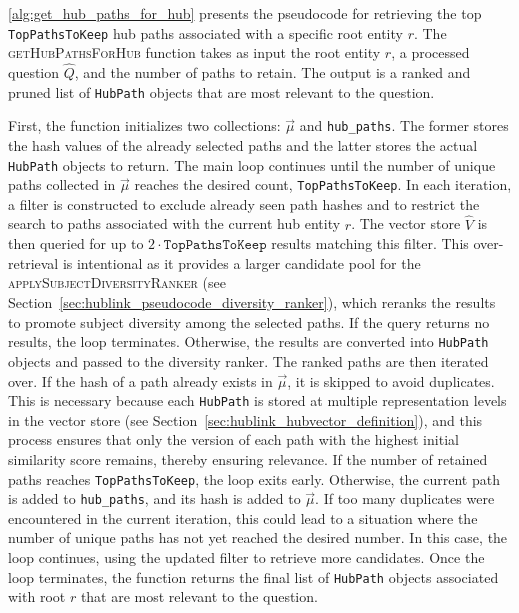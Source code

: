 \autoref{alg:get_hub_paths_for_hub} presents the pseudocode for retrieving the top \texttt{TopPathsToKeep} hub paths associated with a specific root entity \(r\). The \textsc{getHubPathsForHub} function takes as input the root entity \(r\), a processed question \(\hat{Q}\), and the number of paths to retain. The output is a ranked and pruned list of \texttt{HubPath} objects that are most relevant to the question.

First, the function initializes two collections: \(\vec{\mu}\) and \texttt{hub\_paths}. The former stores the hash values of the already selected paths and the latter stores the actual \texttt{HubPath} objects to return. The main loop continues until the number of unique paths collected in \(\vec{\mu}\) reaches the desired count, \texttt{TopPathsToKeep}. In each iteration, a filter is constructed to exclude already seen path hashes and to restrict the search to paths associated with the current hub entity \(r\). The vector store \(\hat{V}\) is then queried for up to \(2 \cdot \texttt{TopPathsToKeep}\) results matching this filter. This over-retrieval is intentional as it provides a larger candidate pool for the \textsc{applySubjectDiversityRanker} (see Section~\ref{sec:hublink_pseudocode_diversity_ranker}), which reranks the results to promote subject diversity among the selected paths. If the query returns no results, the loop terminates. Otherwise, the results are converted into \texttt{HubPath} objects and passed to the diversity ranker. The ranked paths are then iterated over. If the hash of a path already exists in \(\vec{\mu}\), it is skipped to avoid duplicates. This is necessary because each \texttt{HubPath} is stored at multiple representation levels in the vector store (see Section~\ref{sec:hublink_hubvector_definition}), and this process ensures that only the version of each path with the highest initial similarity score remains, thereby ensuring relevance. If the number of retained paths reaches \texttt{TopPathsToKeep}, the loop exits early. Otherwise, the current path is added to \texttt{hub\_paths}, and its hash is added to \(\vec{\mu}\). If too many duplicates were encountered in the current iteration, this could lead to a situation where the number of unique paths has not yet reached the desired number. In this case, the loop continues, using the updated filter to retrieve more candidates. Once the loop terminates, the function returns the final list of \texttt{HubPath} objects associated with root \(r\) that are most relevant to the question.



